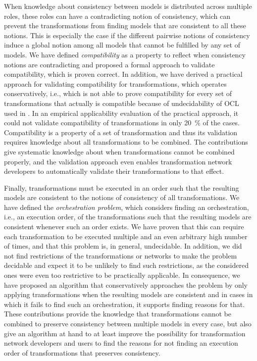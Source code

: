When knowledge about consistency between models is distributed across multiple roles, these roles can have a contradicting notion of consistency, which can prevent the transformations from finding models that are consistent to all these notions.
This is especially the case if the different pairwise notions of consistency induce a global notion among all models that cannot be fulfilled by any set of models.
We have defined \emph{compatibility} as a property to reflect when consistency notions are contradicting and proposed a formal approach to validate compatibility, which is proven correct.
In addition, we have derived a practical approach for validating compatibility for \qvtr transformations, which operates conservatively, i.e., which is not able to prove compatibility for every set of transformations that actually is compatible because of undecidability of \gls{OCL} used in \qvtr.
In an empirical applicability evaluation of the practical approach, it could not validate compatibility of transformations in only \SI{20}{\percent} of the cases.
Compatibility is a property of a set of transformation and thus its validation requires knowledge about all transformations to be combined.
The contributions give systematic knowledge about when transformations cannot be combined properly, and the validation approach even enables transformation network developers to automatically validate their transformations to that effect.

Finally, transformations must be executed in an order such that the resulting models are consistent to the notions of consistency of all transformations.
We have defined the \emph{orchestration problem}, which considers finding an orchestration, i.e., an execution order, of the transformations such that the resulting models are consistent whenever such an order exists.
We have proven that this can require each transformation to be executed multiple and an even arbitrary high number of times, and that this problem is, in general, undecidable.
In addition, we did not find restrictions of the transformations or networks to make the problem decidable and expect it to be unlikely to find such restrictions, as the considered ones were even too restrictive to be practically applicable.
In consequence, we have proposed an algorithm that conservatively approaches the problem by only applying transformations when the resulting models are consistent and in cases in which it fails to find such an orchestration, it supports finding reasons for that.
These contributions provide the knowledge that transformations cannot be combined to preserve consistency between multiple models in every case, but also give an algorithm at hand to at least improve the possibility for transformation network developers and users to find the reasons for not finding an execution order of transformations that preserves consistency.

